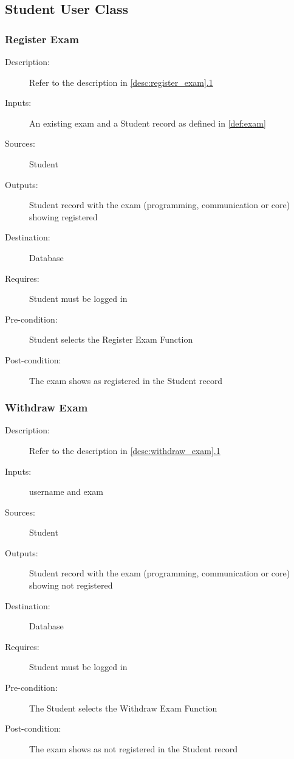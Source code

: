 \subsection{Student User Class}

\subsubsection{\large Register Exam} 
\begin{boxed} %
\begin{description}
\item[Description:]
   Refer to the description in \autoref{desc:register_exam}\hyperref[desc:register_exam]{.1}
\item[Inputs:]
   An existing exam and a Student record as defined in \autoref{def:exam}
\item[Sources:]
   Student
\item[Outputs:]
   Student record with the exam (programming, communication or core) showing
   registered
\item[Destination:]
   Database
\item[Requires:]
   Student must be logged in
\item[Pre-condition:]
   Student selects the Register Exam Function
\item[Post-condition:]
   The exam shows as registered in the Student record
\end{description}
\end{boxed} %

\subsubsection{\large Withdraw Exam} 
\begin{boxed} %
\begin{description}
\item[Description:]
   Refer to the description in \autoref{desc:withdraw_exam}\hyperref[desc:withdraw_exam]{.1}
\item[Inputs:]
   username and exam
\item[Sources:]
   Student
\item[Outputs:]
   Student record with the exam (programming, communication or core) showing
   not registered
\item[Destination:]
   Database
\item[Requires:]
   Student must be logged in
\item[Pre-condition:]
   The Student selects the Withdraw Exam Function
\item[Post-condition:]
   The exam shows as not registered in the Student record
\end{description}
\end{boxed} %

